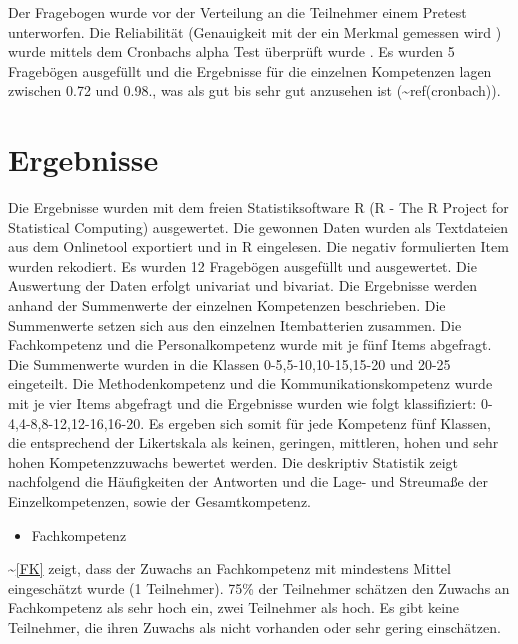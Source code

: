 \documentclass[12pt, bibliography=totoc]{scrartcl}
\begin{document}
Der Fragebogen wurde vor der Verteilung an die Teilnehmer einem Pretest
unterworfen. Die Reliabilität (Genauigkeit mit der ein Merkmal gemessen
wird \parencite[5]{rammstedt2004bestimmung}) wurde mittels dem Cronbachs
alpha Test überprüft wurde \parencite{Wassa}. Es wurden 5 Fragebögen
ausgefüllt und die Ergebnisse für die einzelnen Kompetenzen lagen
zwischen 0.72 und 0.98., was als gut bis sehr gut anzusehen ist
(\textasciitilde{}ref(cronbach)).

\section{Ergebnisse}\label{ergebnisse}

Die Ergebnisse wurden mit dem freien Statistiksoftware R (R - The R
Project for Statistical Computing) ausgewertet. Die gewonnen Daten
wurden als Textdateien aus dem Onlinetool exportiert und in R
eingelesen. Die negativ formulierten Item wurden rekodiert. Es wurden 12
Fragebögen ausgefüllt und ausgewertet. Die Auswertung der Daten erfolgt
univariat und bivariat. Die Ergebnisse werden anhand der Summenwerte der
einzelnen Kompetenzen beschrieben. Die Summenwerte setzen sich aus den
einzelnen Itembatterien zusammen. Die Fachkompetenz und die
Personalkompetenz wurde mit je fünf Items abgefragt. Die Summenwerte
wurden in die Klassen 0-5,5-10,10-15,15-20 und 20-25 eingeteilt. Die
Methodenkompetenz und die Kommunikationskompetenz wurde mit je vier
Items abgefragt und die Ergebnisse wurden wie folgt klassifiziert:
0-4,4-8,8-12,12-16,16-20. Es ergeben sich somit für jede Kompetenz fünf
Klassen, die entsprechend der Likertskala als keinen, geringen,
mittleren, hohen und sehr hohen Kompetenzzuwachs bewertet werden. Die
deskriptiv Statistik zeigt nachfolgend die Häufigkeiten der Antworten
und die Lage- und Streumaße der Einzelkompetenzen, sowie der
Gesamtkompetenz.

\begin{itemize}
\tightlist
\item
  Fachkompetenz
\end{itemize}

\textasciitilde{}\ref{FK} zeigt, dass der Zuwachs an Fachkompetenz mit
mindestens Mittel eingeschätzt wurde (1 Teilnehmer). 75\% der Teilnehmer
schätzen den Zuwachs an Fachkompetenz als sehr hoch ein, zwei Teilnehmer
als hoch. Es gibt keine Teilnehmer, die ihren Zuwachs als nicht
vorhanden oder sehr gering einschätzen.
\end{document}
